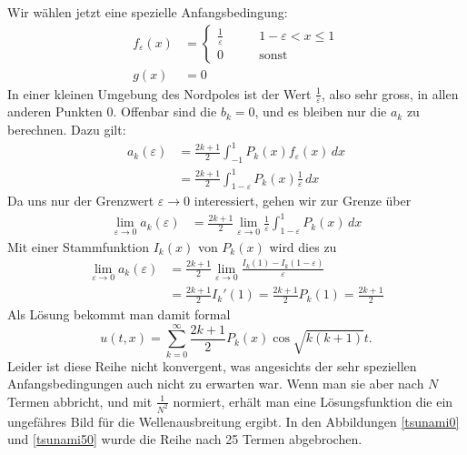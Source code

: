 Wir wählen jetzt eine spezielle Anfangsbedingung:
\begin{align*}
f_\varepsilon(x)&=\begin{cases}
\frac1{\varepsilon}&\qquad 1-\varepsilon<x\le 1\\
0&\qquad\text{sonst}
\end{cases}
\\
g(x)&=0
\end{align*}
In einer kleinen Umgebung des Nordpoles ist der Wert 
$\frac1{\varepsilon}$, also sehr gross, in allen anderen Punkten $0$.
Offenbar sind die $b_k=0$, und es bleiben nur die 
$a_k$ zu berechnen. Dazu gilt:
\begin{align*}
a_k(\varepsilon)&=\frac{2k+1}{2}\int_{-1}^1P_k(x)f_\varepsilon(x)\,dx
\\
&=\frac{2k+1}{2}\int_{1-\varepsilon}^1P_k(x)\frac1{\varepsilon}\,dx
\end{align*}
Da uns nur der Grenzwert $\varepsilon\to 0$ interessiert, gehen wir
zur Grenze über
\begin{align*}
\lim_{\varepsilon\to 0} a_k(\varepsilon)
&=
\frac{2k+1}{2}\lim_{\varepsilon\to 0}\frac1{\varepsilon}\int_{1-\varepsilon}^1P_k(x)\,dx
\end{align*}
Mit einer Stammfunktion $I_k(x)$ von $P_k(x)$ wird dies zu
\begin{align*}
\lim_{\varepsilon\to 0} a_k(\varepsilon)
&=
\frac{2k+1}{2}\lim_{\varepsilon\to 0}\frac{I_k(1)-I_k(1-\varepsilon)}{\varepsilon}
\\
&=\frac{2k+1}{2}I_k'(1)=\frac{2k+1}{2}P_k(1)=\frac{2k+1}{2}
\end{align*}
Als Lösung bekommt man damit formal
\begin{equation}
u(t,x)
=
\sum_{k=0}^\infty \frac{2k+1}{2}P_k(x) \cos \sqrt{k(k+1)}t.
\end{equation}
Leider ist diese Reihe nicht konvergent, was angesichts der sehr
speziellen Anfangsbedingungen auch nicht zu erwarten war.
Wenn man sie aber nach $N$ Termen abbricht, und mit $\frac1{N^2}$ 
normiert, erhält man eine Lösungsfunktion die ein ungefähres
Bild für die Wellenausbreitung ergibt.
In den Abbildungen \ref{tsunami0} und \ref{tsunami50} wurde die Reihe nach 25 Termen
abgebrochen.
